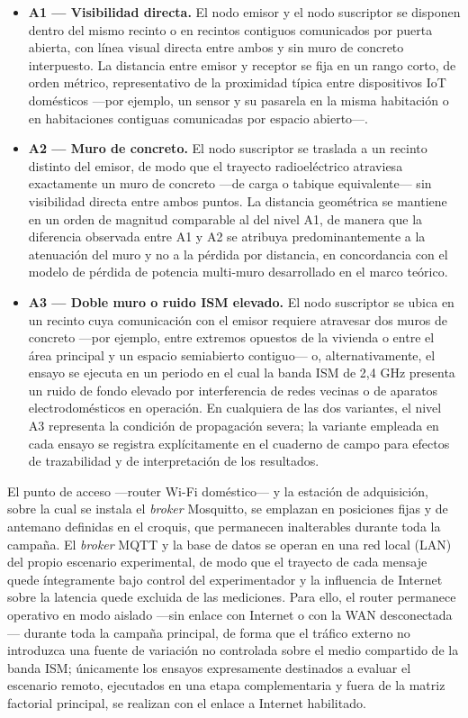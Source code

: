 \documentclass[
  12pt,
]{article}
\begin{document}
\begin{itemize}
\item
  \textbf{A1 — Visibilidad directa.} El nodo emisor y el nodo suscriptor
  se disponen dentro del mismo recinto o en recintos contiguos
  comunicados por puerta abierta, con línea visual directa entre ambos y
  sin muro de concreto interpuesto. La distancia entre emisor y receptor
  se fija en un rango corto, de orden métrico, representativo de la
  proximidad típica entre dispositivos IoT domésticos —por ejemplo, un
  sensor y su pasarela en la misma habitación o en habitaciones
  contiguas comunicadas por espacio abierto—.
\item
  \textbf{A2 — Muro de concreto.} El nodo suscriptor se traslada a un
  recinto distinto del emisor, de modo que el trayecto radioeléctrico
  atraviesa exactamente un muro de concreto —de carga o tabique
  equivalente— sin visibilidad directa entre ambos puntos. La distancia
  geométrica se mantiene en un orden de magnitud comparable al del nivel
  A1, de manera que la diferencia observada entre A1 y A2 se atribuya
  predominantemente a la atenuación del muro y no a la pérdida por
  distancia, en concordancia con el modelo de pérdida de potencia
  multi-muro desarrollado en el marco teórico.
\item
  \textbf{A3 — Doble muro o ruido ISM elevado.} El nodo suscriptor se
  ubica en un recinto cuya comunicación con el emisor requiere atravesar
  dos muros de concreto —por ejemplo, entre extremos opuestos de la
  vivienda o entre el área principal y un espacio semiabierto contiguo—
  o, alternativamente, el ensayo se ejecuta en un periodo en el cual la
  banda ISM de 2,4 GHz presenta un ruido de fondo elevado por
  interferencia de redes vecinas o de aparatos electrodomésticos en
  operación. En cualquiera de las dos variantes, el nivel A3 representa
  la condición de propagación severa; la variante empleada en cada
  ensayo se registra explícitamente en el cuaderno de campo para efectos
  de trazabilidad y de interpretación de los resultados.
\end{itemize}

El punto de acceso —router Wi-Fi doméstico— y la estación de
adquisición, sobre la cual se instala el \emph{broker} Mosquitto, se
emplazan en posiciones fijas y de antemano definidas en el croquis, que
permanecen inalterables durante toda la campaña. El \emph{broker} MQTT y
la base de datos se operan en una red local (LAN) del propio escenario
experimental, de modo que el trayecto de cada mensaje quede íntegramente
bajo control del experimentador y la influencia de Internet sobre la
latencia quede excluida de las mediciones. Para ello, el router
permanece operativo en modo aislado —sin enlace con Internet o con la
WAN desconectada— durante toda la campaña principal, de forma que el
tráfico externo no introduzca una fuente de variación no controlada
sobre el medio compartido de la banda ISM; únicamente los ensayos
expresamente destinados a evaluar el escenario remoto, ejecutados en una
etapa complementaria y fuera de la matriz factorial principal, se
realizan con el enlace a Internet habilitado.
\end{document}
